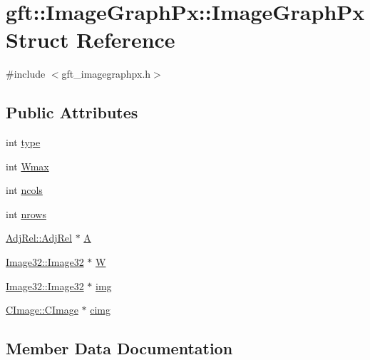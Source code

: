 \hypertarget{structgft_1_1ImageGraphPx_1_1ImageGraphPx}{}\section{gft\+:\+:Image\+Graph\+Px\+:\+:Image\+Graph\+Px Struct Reference}
\label{structgft_1_1ImageGraphPx_1_1ImageGraphPx}


{\ttfamily \#include $<$gft\+\_\+imagegraphpx.\+h$>$}

\subsection*{Public Attributes}
\begin{DoxyCompactItemize}
\item 
int \hyperlink{structgft_1_1ImageGraphPx_1_1ImageGraphPx_ad6a1921efaf31f98fc16b12e622459a3}{type}
\item 
int \hyperlink{structgft_1_1ImageGraphPx_1_1ImageGraphPx_ae0daf2408cba9edfea66b134dffc1ee2}{Wmax}
\item 
int \hyperlink{structgft_1_1ImageGraphPx_1_1ImageGraphPx_ac705cc930a92e0861097c877d213fc78}{ncols}
\item 
int \hyperlink{structgft_1_1ImageGraphPx_1_1ImageGraphPx_af32dec714c37e33f670780b0cabae2e1}{nrows}
\item 
\hyperlink{namespacegft_1_1AdjRel_a832ff5521af7a9801ff18dc3ae629b68}{Adj\+Rel\+::\+Adj\+Rel} $\ast$ \hyperlink{structgft_1_1ImageGraphPx_1_1ImageGraphPx_a43c5b620acbaffe3c431b49238571c93}{A}
\item 
\hyperlink{namespacegft_1_1Image32_a6c5a03566b593bb406f1fe33266a0382}{Image32\+::\+Image32} $\ast$ \hyperlink{structgft_1_1ImageGraphPx_1_1ImageGraphPx_a8c4d8b7a8d10d627e0de1dde2bca80f5}{W}
\item 
\hyperlink{namespacegft_1_1Image32_a6c5a03566b593bb406f1fe33266a0382}{Image32\+::\+Image32} $\ast$ \hyperlink{structgft_1_1ImageGraphPx_1_1ImageGraphPx_a12cac3b69dad72bf5f1e93e3a00e5e43}{img}
\item 
\hyperlink{namespacegft_1_1CImage_ae3efa12a0ed0755314837d3e5c974556}{C\+Image\+::\+C\+Image} $\ast$ \hyperlink{structgft_1_1ImageGraphPx_1_1ImageGraphPx_a098132f6d0e2e273b28d0139e9ffbeba}{cimg}
\end{DoxyCompactItemize}


\subsection{Member Data Documentation}
